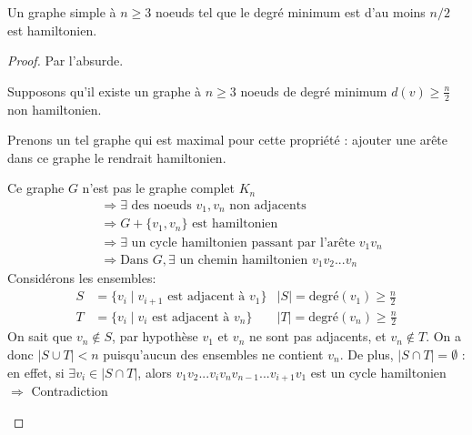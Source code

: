 \begin{mytheo} 
  Un graphe simple à $n \geq 3$ noeuds tel que le degré minimum est d’au moins $n/2$ est hamiltonien.
  \begin{proof}
     Par l'absurde.

     Supposons qu'il existe un graphe à $n \geq 3$ noeuds de degré minimum $d(v) \geq \frac{n}{2}$ non hamiltonien.

     Prenons un tel graphe qui est maximal pour cette propriété : ajouter une arête dans ce graphe le rendrait hamiltonien.

     Ce graphe $G$ n'est pas le graphe complet $K_n$
     \begin{align*}
		&\Rightarrow \exists \text{ des noeuds } v_1, v_n \text{ non adjacents} \\
		&\Rightarrow G + \{v_1, v_n \} \text{ est hamiltonien} \\
		&\Rightarrow \exists \text{ un cycle hamiltonien passant par l'arête } v_1v_n \\
		&\Rightarrow \text{Dans } G, \exists \text{ un chemin hamiltonien } v_1v_2...v_n
	\end{align*}
	Considérons les ensembles:
	\begin{align*}
		S &= \{v_i \mid v_{i+1} \text{ est adjacent à } v_1\} &\vert S \vert = \text{degré}(v_1) \geq \frac{n}{2}\\
		T &= \{v_i \mid v_{i} \text{ est adjacent à } v_n\} &\vert T \vert = \text{degré}(v_n) \geq \frac{n}{2}
	\end{align*}
	On sait que $v_n \not\in S$, par hypothèse $v_1$ et $v_n$ ne sont pas adjacents, et $v_n \not\in T$. On a donc $\vert S \cup T \vert < n$ puisqu'aucun des ensembles ne contient $v_n$.
	De plus, $\vert S \cap T \vert = \emptyset $ : en effet, si $\exists v_i \in \vert S \cap T \vert$, alors $v_1v_2...v_iv_nv_{n-1}...v_{i+1}v_1$ est un cycle hamiltonien $\Rightarrow$ Contradiction
	\begin{figure} [!h]
		\center
\end{figure}
\end{proof}
\end{mytheo}
